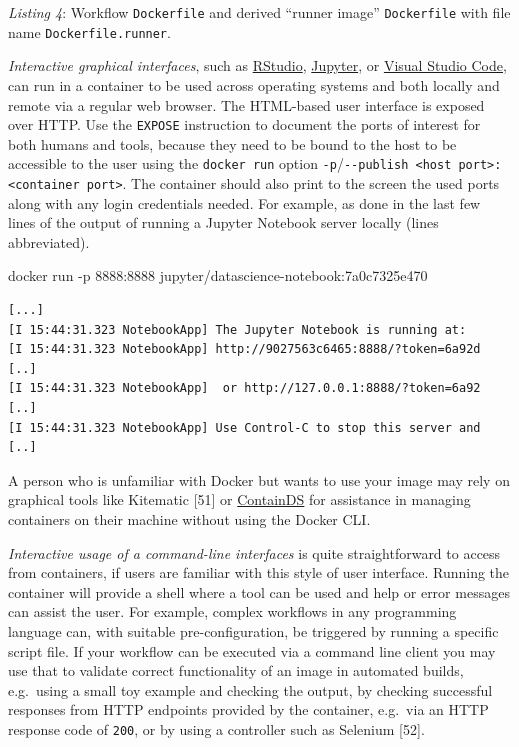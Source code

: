 \documentclass[10pt,letterpaper]{article}
\newenvironment{Shaded}{\begin{snugshade}}{\end{snugshade}}
\newcommand{\ExtensionTok}[1]{#1}
\newcommand{\NormalTok}[1]{#1}
\begin{document}
\normalsize

\emph{Listing 4}: Workflow \texttt{Dockerfile} and derived ``runner
image'' \texttt{Dockerfile} with file name \texttt{Dockerfile.runner}.
\newline

\emph{Interactive graphical interfaces}, such as
\href{https://rstudio.com/products/rstudio/}{RStudio},
\href{https://jupyter.org/}{Jupyter}, or
\href{https://code.visualstudio.com/}{Visual Studio Code}, can run in a
container to be used across operating systems and both locally and
remote via a regular web browser. The HTML-based user interface is
exposed over HTTP. Use the \texttt{EXPOSE} instruction to document the
ports of interest for both humans and tools, because they need to be
bound to the host to be accessible to the user using the
\texttt{docker\ run} option
\texttt{-p}/\texttt{-\/-publish\ \textless{}host\ port\textgreater{}:\textless{}container\ port\textgreater{}}.
The container should also print to the screen the used ports along with
any login credentials needed. For example, as done in the last few lines
of the output of running a Jupyter Notebook server locally (lines
abbreviated).

\footnotesize

\begin{Shaded}
\begin{Highlighting}[]
\ExtensionTok{docker}\NormalTok{ run -p 8888:8888 jupyter/datascience-notebook:7a0c7325e470}
\end{Highlighting}
\end{Shaded}

\begin{verbatim}
[...]
[I 15:44:31.323 NotebookApp] The Jupyter Notebook is running at:
[I 15:44:31.323 NotebookApp] http://9027563c6465:8888/?token=6a92d [..]
[I 15:44:31.323 NotebookApp]  or http://127.0.0.1:8888/?token=6a92 [..]
[I 15:44:31.323 NotebookApp] Use Control-C to stop this server and [..]
\end{verbatim}

\normalsize

A person who is unfamiliar with Docker but wants to use your image may
rely on graphical tools like Kitematic {[}51{]} or
\href{https://containds.com/}{ContainDS} for assistance in managing
containers on their machine without using the Docker CLI.

\emph{Interactive usage of a command-line interfaces} is quite
straightforward to access from containers, if users are familiar with
this style of user interface. Running the container will provide a shell
where a tool can be used and help or error messages can assist the user.
For example, complex workflows in any programming language can, with
suitable pre-configuration, be triggered by running a specific script
file. If your workflow can be executed via a command line client you may
use that to validate correct functionality of an image in automated
builds, e.g.~using a small toy example and checking the output, by
checking successful responses from HTTP endpoints provided by the
container, e.g.~via an HTTP response code of \texttt{200}, or by using a
controller such as Selenium {[}52{]}.
\end{document}
